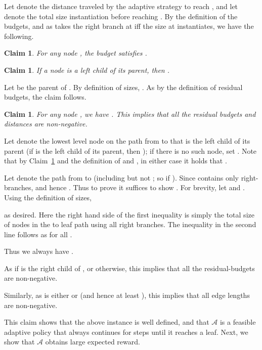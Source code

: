 \documentclass[11pt,letterpaper]{article}
\newtheorem{claim}[theorem]{Claim}
\numberwithin{algorithm}{section}
\newenvironment{proof}{

\noindent{\bf Proof:}}
{\hfill


}
\newcommand{\A}[0]{{\ensuremath{\mathcal{A}}}\xspace}
\begin{document}
Let  denote the distance traveled by the adaptive strategy  to reach , and let  denote the total size instantiation before reaching . By the definition of the budgets, and as  takes the right branch at  iff the size at  instantiates, we have the following.

\begin{claim}
\label{lem:bv}
For any node , the budget  satisfies .
\end{claim}

\begin{claim}
\label{size:val}
If a node  is a left child of its parent, then .
\end{claim}
\begin{proof}
Let  be the parent of .
By definition of sizes, .
As  by the definition of residual budgets, the claim follows.
\end{proof}


\begin{claim}\label{cl:well-defn}
For any node , we have . This implies that all the residual budgets and distances are non-negative.
\end{claim}
\begin{proof}
Let  denote the lowest level node on the path from  to  that is the left child of its parent (if  is the left child of its parent, then ); if there is no such node, set .
Note that by Claim~\ref{size:val} and the definition of  and , in either case it holds that .

Let  denote the path from  to  (including  but not ; so  if ).
Since  contains only right-branches,  and hence . Thus to prove  it  suffices to show . For brevity, let  and . Using the definition of sizes,

as desired.  Here the right hand side of the first inequality is simply the total size of nodes in the  to leaf path using all right branches. The inequality in the second line follows as  for all .

Thus we always have .

As  if  is the right child of , or  otherwise, this implies that all the residual-budgets are non-negative.

Similarly, as  is either  or  (and hence at least ), this implies that all edge lengths are non-negative.
\end{proof}

This claim shows that the above instance is well defined, and that  \A is a feasible adaptive policy that always continues for  steps until it reaches a leaf. Next, we show that \A obtains large expected reward.
\end{document}
